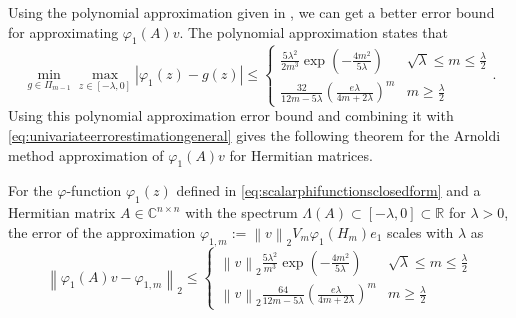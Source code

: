 Using the polynomial approximation given in \cite[Lemma A.1]{kressner2019krylov},
we can get a better error bound for approximating $\varphi_1(A)v$.
The polynomial approximation states that
\begin{equation}
    \min_{g \in \Pi_{m-1}} \max_{z \in [-\lambda, 0]} \left|\varphi_1(z) - g(z) \right| \le
    \begin{cases}
        \frac{5\lambda^2}{2m^3} \exp \left( -\frac{4m^2}{5\lambda} \right) & \sqrt{\lambda} \le m \le \frac{\lambda}{2}
        \\
        \frac{32}{12m-5\lambda} \left( \frac{e \lambda}{4m+2\lambda} \right)^m & m \ge \frac{\lambda}{2}
    \end{cases}.
\end{equation}
Using this polynomial approximation error bound and combining it with
\eqref{eq:univariateerrorestimationgeneral} gives the following theorem for the
Arnoldi method approximation of $\varphi_1(A)v$ for Hermitian matrices.
\begin{theorem}
    \label{the:univariateerrorestimationchebyshev}
    For the $\varphi$-function $\varphi_1(z)$ defined in \eqref{eq:scalarphifunctionsclosedform}
    and a Hermitian matrix $A \in \mathbb{C}^{n \times n}$ with the spectrum
    $\Lambda(A) \subset [-\lambda, 0] \subset \mathbb{R}$ for $\lambda > 0$,
    the error of the approximation $\varphi_{1, m} := \left\| v \right\|_{2} V_m \varphi_1(H_m) e_1$
    scales with $\lambda$ as
    \begin{equation}
        \label{eq:univariateerrorestimationphi1}
        \left\| \varphi_1(A)v - \varphi_{1, m} \right\|_2 \le
        \begin{cases}
            \left\| v \right\|_2 \frac{5\lambda^2}{m^3} \exp \left( -\frac{4m^2}{5\lambda} \right)
            & \sqrt{\lambda} \le m \le \frac{\lambda}{2}
            \\
            \left\| v \right\|_2 \frac{64}{12m-5\lambda} \left( \frac{e \lambda}{4m+2\lambda} \right)^m
            & m \ge \frac{\lambda}{2}
        \end{cases}
    \end{equation}
\end{theorem}

